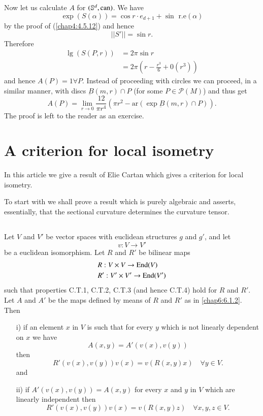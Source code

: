 \begin{example*}
Now let us calculate $A$ for $(\mathbb{S}^{d},\operatorname{can})$. We have
$$
\exp(S(\alpha))=\cos r\cdot e_{d+1}+\sin\text{ r.e}(\alpha)
$$
by the proof of (\ref{chap4:4.5.12}) and hence
$$
||S'||=\sin r.
$$
Therefore\pageoriginale
\begin{align*}
\lg(S(P,r)) &= 2\pi \sin r\\
            &= 2\pi\left(r-\frac{r^{3}}{6}+0(r^{3})\right)
\end{align*}
and hence $A(P)=1\forall P$. Instead of proceeding with circles we can
proceed, in a similar manner, with discs $\underbar{B}(m,r)\cap P$
(for some $P\in\mathscr{P}(M)$) and thus get
\begin{equation*}
A(P)=\lim\limits_{r\to 0}\frac{12}{\pi r^{4}}(\pi
r^{2}-\text{ar}(\exp\underbar{B}(m,r)\cap P)).\tag{6.3.15}\label{chap6:6.3.15}
\end{equation*}
The proof is left to the reader as an exercise.
\end{example*}

\section{A criterion for local isometry}\label{chap6:sec4}

In this article we give a result of Elie Cartan which gives a
criterion for local isometry.

To start with we shall prove a result which is purely algebraic and
asserts, essentially, that the sectional curvature determines the
curvature tensor.


\subsection{}\label{chap6:6.4.1}

\begin{prop*}
Let $V$ and $V'$ be vector spaces with euclidean structures $g$ and
$g'$, and let
$$
v:V\to V'
$$
be a euclidean isomorphism. Let $R$ and $R'$ be bilinear maps
\begin{align*}
& R:V\times V\to \operatorname{End}(V)\\
& R':V'\times V'\to \operatorname{End}(V')
\end{align*}
such that properties C.T.1, C.T.2, C.T.3 (and hence C.T.4) hold for
$R$ and $R'$. Let $A$ and $A'$ be the maps defined by means of $R$ and
$R'$ as in \eqref{chap6:6.1.2}. Then\pageoriginale
\begin{itemize}
\item[\rm i)] if an element $x$ in $V$ is such that for every $y$
  which is not linearly dependent on $x$ we have
\begin{equation*}
A(x,y)=A'(v(x),v(y))\tag{6.4.2}\label{chap6:6.4.2a}
\end{equation*}
then 
$$
R'(v(x),v(y))v(x)=v(R(x,y)x)\quad \forall y\in V.
$$
and

\item[\rm ii)] if $A'(v(x),v(y))=A(x,y)$ for every $x$ and $y$ in $V$
  which are linearly independent then
$$
R'(v(x),v(y))v(x)=v(R(x,y)z)\quad\forall x,y,z\in V.
$$
\end{itemize}
\end{prop*}

